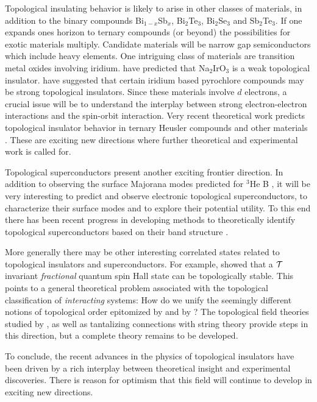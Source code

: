 \documentclass[twocolumn,floatfix,showpacs,rmp,aps]{revtex4}
\begin{document}
	Topological insulating behavior is likely to arise in other classes
	of materials, in addition to the binary compounds Bi$_{1-x}$Sb$_x$,
	Bi$_2$Te$_3$, Bi$_2$Se$_3$ and Sb$_2$Te$_3$.
	If one expands ones horizon to ternary compounds (or beyond) the
	possibilities for exotic materials multiply.  Candidate materials will be narrow
	gap semiconductors which include heavy elements.  One intriguing class
	of materials are transition metal oxides involving iridium.
	\textcite{shitade09} have predicted that
	Na$_2$IrO$_3$ is a weak topological insulator.  \textcite{pesin10}
	have suggested that certain iridium based pyrochlore compounds
	may be strong topological insulators.  Since these materials
	involve $d$ electrons, a crucial issue will be to understand the interplay
	between strong electron-electron interactions and the spin-orbit interaction.
	Very recent theoretical work predicts topological insulator behavior
	in ternary Heusler compounds\cite{lin10a,chadov10} and other materials
	\cite{lin10b,lin10c,yan10}.
	These are exciting new directions where further theoretical and experimental
	work is called for.
	
	Topological superconductors present another exciting frontier direction.
	In addition to observing the surface Majorana modes predicted for $^3$He B \cite{chung09}, it will be very
	interesting to predict and observe electronic topological superconductors,
	to characterize their surface modes
	and to explore their potential utility.  To this end there
	has been recent progress in developing methods to theoretically identify topological
	superconductors based on their band structure \cite{qi10,fuberg10}.
	
	More generally there may be other interesting correlated states related to topological
	insulators and superconductors.  For example, \textcite{levin09} showed that
	a ${\cal T}$ invariant {\it fractional} quantum spin Hall state can be topologically stable.
	This points to a general theoretical problem associated with the
	topological classification of {\it interacting} systems: How do we
	unify the seemingly different notions of topological order
	epitomized by \textcite{thouless82} and by \textcite{wen95}?
	The topological field theories studied by
	\textcite{qihugheszhang08}, as well as tantalizing connections
	with string theory \cite{ryu10} provide steps in this direction, but a complete
	theory remains to be developed.
	
	To conclude, the recent advances in the physics of topological insulators have been driven
	by a rich interplay between theoretical insight and experimental
	discoveries.  There is reason for optimism that this field
	will continue to develop in exciting new directions.
	
\end{document}

